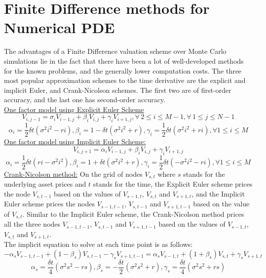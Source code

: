 \section*{Finite Difference methods for Numerical PDE}
The advantages of a Finite Difference valuation scheme over Monte Carlo simulations lie in the fact that there have been a lot of well-developed methods for the known problems, and the generally lower computation costs. The three most popular approximation schemes to the time derivative are the explicit and implicit Euler, and Crank-Nicolson schemes. The first two are of first-order accuracy, and the last one has second-order accuracy\cite{FiniteDifference}.\\
\underline{One factor model using Explicit Euler Scheme}
$$V_{i, j-1} = \sigma_{i}V_{i-1,j} + \beta_{i}V_{i,j} + \gamma_{i}V_{i+1,j},  \forall \,2 \le i \le M-1, \forall \,1 \le j \le N-1$$
$$\alpha_{i} = \frac{1}{2}\delta t(\sigma^{2}i^{2} - ri), \beta_{i} = 1-\delta t(\sigma^{2}i^{2} + r), \gamma_{i} = \frac{1}{2}\delta t(\sigma^{2}i^{2} + ri), \forall 1 \le i \le M$$
\underline{One factor model using Implicit Euler Scheme:}
$$V_{i, j+1} = \alpha_{i}V_{i-1,j} + \beta_{i}V_{i,j} + \gamma_{i}V_{i+1,j}$$
$$\alpha_{i} = \frac{1}{2}\delta t(ri-\sigma^{2}i^{2}), \beta_{i} = 1+\delta t(\sigma^{2}i^{2} + r), \gamma_{i} = \frac{1}{2}\delta t(-\sigma^{2}i^{2} - ri), \forall 1 \le i \le M$$
\underline{Crank-Nicolson method:}
On the grid of nodes $V_{s,t}$ where $s$ stands for the underlying asset prices and $t$ stands for the time, the Explicit Euler scheme prices the node $V_{s,t-1}$ based on the values of $V_{s-1,t}$, $V_{s,t}$ and $V_{s+1,t}$, and the Implicit Euler scheme prices the nodes $V_{s-1,t-1}$, $V_{s,t-1}$ and $V_{s+1,t-1}$ based on the value of $V_{s,t}$. Similar to the Implicit Euler scheme, the Crank-Nicolson method prices all the three nodes $V_{s-1,t-1}$, $V_{s,t-1}$ and $V_{s+1,t-1}$ based on the values of $V_{s-1,t}$, $V_{s,t}$ and $V_{s+1,t}$.\\
The implicit equation to solve at each time point is as follows:
$$-\alpha_{s}V_{s-1,t-1} + (1-\beta_{s})V_{s,t-1} - \gamma_{s}V_{s+1,t-1} = \alpha_{s}V_{s-1,t} + (1+\beta_{s})V_{s,t} + \gamma_{s}V_{s+1,t}$$
$$\alpha_{s} = \frac{\delta t}{4}(\sigma^{2}s^{2} - rs), \beta_{s} = -\frac{\delta t}{2}(\sigma^{2}s^{2} + r), \gamma_{s} = \frac{\delta t}{4}(\sigma^{2}s^{2} + rs)$$

